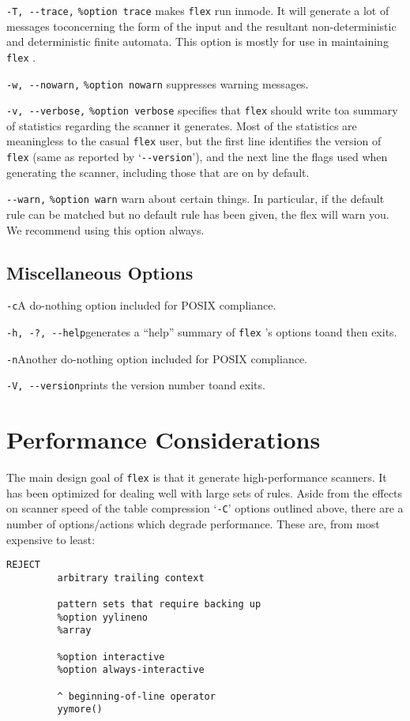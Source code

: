 \documentclass[openany,oneside]{book}
\begin{document}
\verb`-T, --trace,` \verb`%option trace` makes \verb`flex` run inmode.  It will generate a lot of
messages toconcerning the form of the input and the
resultant non-deterministic and deterministic finite automata.  This
option is mostly for use in maintaining \verb`flex` .

\verb`-w, --nowarn,` \verb`%option nowarn` suppresses warning messages.

\verb`-v, --verbose,` \verb`%option verbose` specifies that \verb`flex` should write toa summary of
statistics regarding the scanner it generates.  Most of the statistics
are meaningless to the casual \verb`flex` user, but the first line
identifies the version of \verb`flex` (same as reported by ‘\verb`--version`’),
and the next line the flags used when generating the scanner, including
those that are on by default.

\verb`--warn,` \verb`%option warn` warn about certain things. In particular, if the default rule can be
matched but no default rule has been given, the flex will warn you. 
We recommend using this option always.
\section{Miscellaneous Options}
\verb`-c`A do-nothing option included for POSIX compliance.

\verb`-h, -?, --help`generates a “help” summary of \verb`flex` 's options toand then exits.

\verb`-n`Another do-nothing option included for
POSIX compliance.

\verb`-V, --version`prints the version number toand exits.
\chapter{Performance Considerations}


The main design goal of \verb`flex` is that it generate high-performance
scanners.  It has been optimized for dealing well with large sets of
rules.  Aside from the effects on scanner speed of the table compression
‘\verb`-C`’ options outlined above, there are a number of options/actions
which degrade performance.  These are, from most expensive to least:


\begin{verbatim}
REJECT
         arbitrary trailing context
     
         pattern sets that require backing up
         %option yylineno
         %array
     
         %option interactive
         %option always-interactive
     
         ^ beginning-of-line operator
         yymore()
\end{verbatim}
\end{document}
